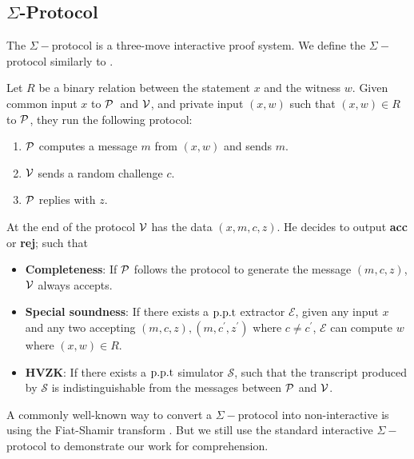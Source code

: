 \subsection{$\Sigma$-Protocol}

The $\Sigma-$protocol is a three-move interactive proof system. We define the $\Sigma-$protocol similarly to \cite{damgard10}.
\begin{definition}
\label{sec:sigma}
Let $R$ be a binary relation between the statement $x$ and the witness $w$. Given common input $x$ to $\mathcal{P}$\ and $\mathcal{V}$, and private input $(x,w)$ such that $(x,w)\in{R}$ to $\mathcal{P}$, they run the following protocol:
\begin{enumerate}
    \item $\mathcal{P}$ computes a message $m$ from $(x,w)$ and sends $m$.
    \item $\mathcal{V}$ sends a random challenge $c$.
    \item $\mathcal{P}$ replies with $z$.
\end{enumerate}
At the end of the protocol $\mathcal{V}$ has the data $(x,m,c,z)$. He decides to output \textbf{acc} or \textbf{rej}; such that
\begin{itemize}
    \item \textbf{Completeness}: If $\mathcal{P}$ follows the protocol to generate the message $(m,c,z)$, $\mathcal{V}$ always accepts.
    \item \textbf{Special soundness}: If there exists a $\text{p.p.t}$ extractor $\mathcal{E}$, given any input $x$ and any two accepting $(m,c,z),(m,c^\prime,z^\prime)$ where $c\ne{c^\prime}$, $\mathcal{E}$ can compute $w$ where $(x,w)\in{R}$.
    \item \textbf{HVZK}: If there exists a $\text{p.p.t}$ simulator $\mathcal{S}$, such that the transcript produced by $\mathcal{S}$ is indistinguishable from the messages between $\mathcal{P}$ and $\mathcal{V}$.
\end{itemize}
\end{definition}
A commonly well-known way to convert a $\Sigma-$protocol into non-interactive is using the Fiat-Shamir transform \cite{fs}. But we still use the standard interactive $\Sigma-$protocol to demonstrate our work for comprehension.

